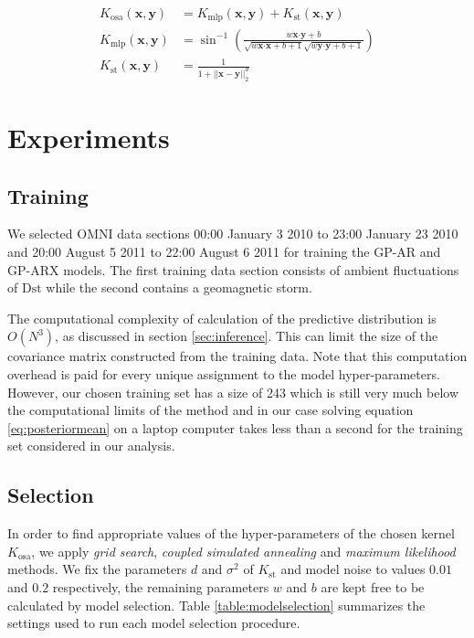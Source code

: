 \begin{align}
    K_{\text{osa}}(\mathbf{x}, \mathbf{y}) & = K_{\text{mlp}}(\mathbf{x}, \mathbf{y}) + K_{\text{st}}(\mathbf{x}, \mathbf{y}) \label{eq:usedKernel} \\
    K_{\text{mlp}}(\mathbf{x}, \mathbf{y}) & = \sin^{-1}(\frac{w\mathbf{x}\boldsymbol{\cdot} \mathbf{y} + b}{\sqrt{w\mathbf{x}\boldsymbol{\cdot} \mathbf{x} + b + 1} \sqrt{w\mathbf{y}\boldsymbol{\cdot} \mathbf{y} + b + 1}}) \\
    K_{\text{st}}(\mathbf{x}, \mathbf{y}) & = \frac{1}{1 + ||\mathbf{x} - \mathbf{y}||_{2}^d}
\end{align}

\section{Experiments} \label{sec:modeltraining}

\subsection*{Training}

We selected OMNI data sections 00:00 January 3 2010 to 23:00 January 23 2010 and 20:00 August 5 2011 to 22:00 August 6 2011 for training the GP-AR and GP-ARX models. The first training data section consists of ambient fluctuations of $ \mathrm{Dst}$ while the second contains a geomagnetic storm.

The computational complexity of calculation of the predictive distribution is $O(N^3)$, as discussed in section \ref{sec:inference}. This can limit the size of the covariance matrix constructed from the training data. Note that this computation overhead is paid for every unique assignment to the model hyper-parameters. However, our chosen training set has a size of 243 which is still very much below the computational limits of the method and in our case solving equation \ref{eq:posteriormean} on a laptop computer takes less than a second for the training set considered in our analysis. 

\subsection*{Selection}

In order to find appropriate values of the hyper-parameters of the chosen kernel $K_{\text{osa}}$, we apply 
\emph{grid search}, \emph{coupled simulated annealing} and \emph{maximum likelihood} methods. We fix the parameters 
$d$ and $\sigma^2$ of $K_{\text{st}}$ and model noise to values $0.01$ and $0.2$ respectively, the remaining 
parameters $w$ and $b$ are kept free to be calculated by model selection. Table \ref{table:modelselection} 
summarizes the settings used to run each model selection procedure.

